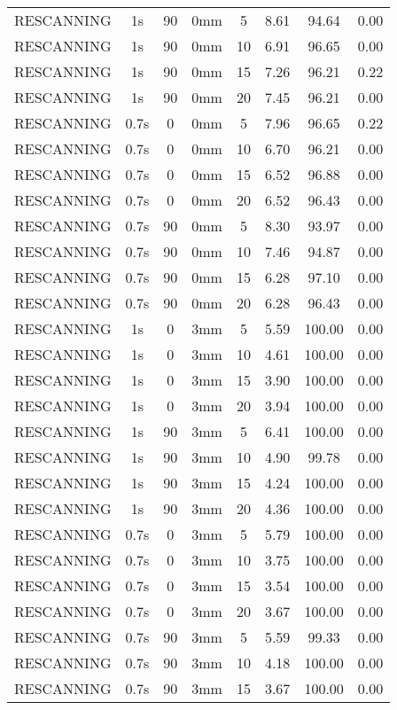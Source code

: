 \begin{table}[H]
\begin{tabular}{|c||c|c|c|c||c|c|c|}
RESCANNING & 1s & 90 & 0mm & 5 & 8.61 & 94.64 & 0.00 \\
RESCANNING & 1s & 90 & 0mm & 10 & 6.91 & 96.65 & 0.00 \\
RESCANNING & 1s & 90 & 0mm & 15 & 7.26 & 96.21 & 0.22 \\
RESCANNING & 1s & 90 & 0mm & 20 & 7.45 & 96.21 & 0.00 \\
RESCANNING & 0.7s & 0 & 0mm & 5 & 7.96 & 96.65 & 0.22 \\
RESCANNING & 0.7s & 0 & 0mm & 10 & 6.70 & 96.21 & 0.00 \\
RESCANNING & 0.7s & 0 & 0mm & 15 & 6.52 & 96.88 & 0.00 \\
RESCANNING & 0.7s & 0 & 0mm & 20 & 6.52 & 96.43 & 0.00 \\
RESCANNING & 0.7s & 90 & 0mm & 5 & 8.30 & 93.97 & 0.00 \\
RESCANNING & 0.7s & 90 & 0mm & 10 & 7.46 & 94.87 & 0.00 \\
RESCANNING & 0.7s & 90 & 0mm & 15 & 6.28 & 97.10 & 0.00 \\
RESCANNING & 0.7s & 90 & 0mm & 20 & 6.28 & 96.43 & 0.00 \\
RESCANNING & 1s & 0 & 3mm & 5 & 5.59 & 100.00 & 0.00 \\
RESCANNING & 1s & 0 & 3mm & 10 & 4.61 & 100.00 & 0.00 \\
RESCANNING & 1s & 0 & 3mm & 15 & 3.90 & 100.00 & 0.00 \\
RESCANNING & 1s & 0 & 3mm & 20 & 3.94 & 100.00 & 0.00 \\
RESCANNING & 1s & 90 & 3mm & 5 & 6.41 & 100.00 & 0.00 \\
RESCANNING & 1s & 90 & 3mm & 10 & 4.90 & 99.78 & 0.00 \\
RESCANNING & 1s & 90 & 3mm & 15 & 4.24 & 100.00 & 0.00 \\
RESCANNING & 1s & 90 & 3mm & 20 & 4.36 & 100.00 & 0.00 \\
RESCANNING & 0.7s & 0 & 3mm & 5 & 5.79 & 100.00 & 0.00 \\
RESCANNING & 0.7s & 0 & 3mm & 10 & 3.75 & 100.00 & 0.00 \\
RESCANNING & 0.7s & 0 & 3mm & 15 & 3.54 & 100.00 & 0.00 \\
RESCANNING & 0.7s & 0 & 3mm & 20 & 3.67 & 100.00 & 0.00 \\
RESCANNING & 0.7s & 90 & 3mm & 5 & 5.59 & 99.33 & 0.00 \\
RESCANNING & 0.7s & 90 & 3mm & 10 & 4.18 & 100.00 & 0.00 \\
RESCANNING & 0.7s & 90 & 3mm & 15 & 3.67 & 100.00 & 0.00 \\

\end{tabular}
\end{table}
